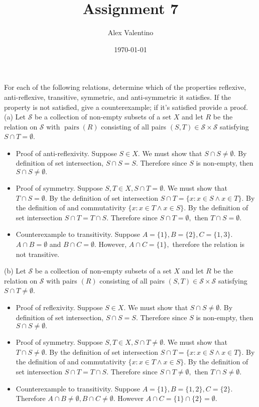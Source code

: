 \documentclass[12pt, letterpaper]{article}
\date{\today}
\author{Alex Valentino}
\title{Assignment 7}
\begin{document}
For each of the following relations, determine which of the properties reflexive, anti-reflexive, transitive, symmetric, and anti-symmetric it satisfies. If the property is not satisfied, give a counterexample; if it's satisfied provide a proof.\\

(a) Let $\mathcal{S}$ be a collection of non-empty subsets of a set $X$ and let $R$ be the relation on $\mathcal{S}$ with $\operatorname{pairs}(R)$ consisting of all pairs $(S, T) \in \mathcal{S} \times \mathcal{S}$ satisfying $S \cap T=\emptyset$.\\
	\begin{itemize}
		\item Proof of anti-reflexivity.  Suppose $S \in X.$  We must show that $S \cap S \neq \emptyset.$  By definition of set intersection, $S \cap S = S.$  Therefore since $S$ is non-empty, then $S \cap S \neq \emptyset.$
		\item Proof of symmetry.  Suppose $S,T \in X,S \cap T = \emptyset$.  We must show that $T \cap S = \emptyset.$  By the definition of set intersection $S \cap T = \{x: x \in S \wedge x \in T\}$.  By the definition of and commutativity $\{x: x \in T \wedge x \in S\}$.  By the definition of set intersection $S \cap T = T \cap S.$ Therefore since $S \cap T = \emptyset,$ then $T \cap S = \emptyset.$
		\item Counterexample to transitivity.  Suppose $A = \{1\}, B = \{2\}, C = \{1,3\}.$  $A \cap B = \emptyset$ and $B \cap C = \emptyset.$  However, $A \cap C = \{1\},$ therefore the relation is not transitive.
	\end{itemize}
(b) Let $\mathcal{S}$ be a collection of non-empty subsets of a set $X$ and let $R$ be the relation on $\mathcal{S}$ with pairs $(R)$ consisting of all pairs $(S, T) \in \mathcal{S} \times \mathcal{S}$ satisfying $S \cap T \neq \emptyset$.\\
	\begin{itemize}
		\item Proof of reflexivity.  Suppose $S \in X.$  We must show that $S \cap S \neq \emptyset.$  By definition of set intersection, $S \cap S = S.$  Therefore since $S$ is non-empty, then $S \cap S \neq \emptyset.$
		\item Proof of symmetry.  Suppose $S,T \in X,S \cap T \neq \emptyset$.  We must show that $T \cap S \neq \emptyset.$  By the definition of set intersection $S \cap T = \{x: x \in S \wedge x \in T\}$.  By the definition of and commutativity $\{x: x \in T \wedge x \in S\}$.  By the definition of set intersection $S \cap T = T \cap S.$ Therefore since $S \cap T \neq \emptyset,$ then $T \cap S \neq \emptyset.$ 
		\item Counterexample to transitivity.  Suppose $A = \{1\}, B = \{1,2\}, C = \{2\}.$  Therefore $A \cap B \neq \emptyset, B \cap C \neq \emptyset.$  However $A \cap C = \{1\} \cap \{2\} = \emptyset.$
	\end{itemize}
\end{document}

